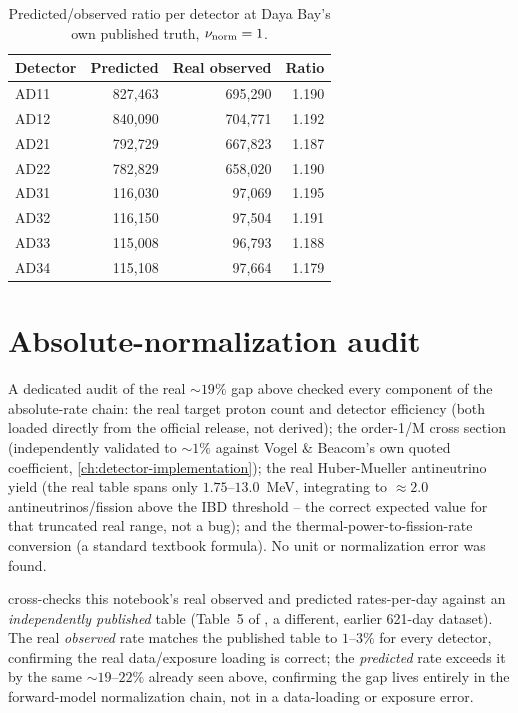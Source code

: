 \begin{table}[htb]
\centering
\caption{Predicted/observed ratio per detector at Daya Bay's own published truth, $\nu_{\rm norm}=1$.}
\label{tab:per-detector-ratio-truth}
\begin{tabular}{@{}lrrr@{}}
\toprule
Detector & Predicted & Real observed & Ratio \\
\midrule
AD11 & 827{,}463  & 695{,}290 & 1.190 \\
AD12 & 840{,}090  & 704{,}771 & 1.192 \\
AD21 & 792{,}729  & 667{,}823 & 1.187 \\
AD22 & 782{,}829  & 658{,}020 & 1.190 \\
AD31 & 116{,}030  &  97{,}069 & 1.195 \\
AD32 & 116{,}150  &  97{,}504 & 1.191 \\
AD33 & 115{,}008  &  96{,}793 & 1.188 \\
AD34 & 115{,}108  &  97{,}664 & 1.179 \\
\bottomrule
\end{tabular}
\end{table}

\section{Absolute-normalization audit}
\label{sec:results-audit}

A dedicated audit of the real $\sim19\%$ gap above checked every component
of the absolute-rate chain: the real target proton count and detector
efficiency (both loaded directly from the official release, not derived);
the order-1/M cross section (independently validated to $\sim1\%$ against
Vogel \& Beacom's own quoted coefficient, \cref{ch:detector-implementation});
the real Huber-Mueller antineutrino yield (the real table spans only
$1.75$--$13.0$~MeV, integrating to $\approx2.0$ antineutrinos/fission above
the IBD threshold -- the correct expected value for that truncated real
range, not a bug); and the thermal-power-to-fission-rate conversion (a
standard textbook formula). No unit or normalization error was found.

\begin{resultbox}
 cross-checks this notebook's real observed and
predicted rates-per-day against an \emph{independently published} table
(Table~5 of \cite{An2017DayaBayFluxSpectrum}, a different, earlier
621-day dataset). The real \emph{observed} rate matches the published table
to $1$--$3\%$ for every detector, confirming the real data/exposure loading
is correct; the \emph{predicted} rate exceeds it by the same
$\sim19$--$22\%$ already seen above, confirming the gap lives entirely in
the forward-model normalization chain, not in a data-loading or exposure
error.
\end{resultbox}

